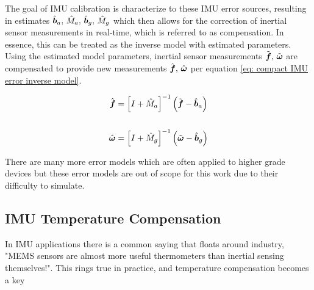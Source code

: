 The goal of IMU calibration is characterize to these IMU error sources, resulting in estimates $\hat{\boldsymbol{b}}_a, \, \hat{M}_a, \, \hat{\boldsymbol{b}}_g, \, \hat{M}_g
$ which then allows for the correction of inertial sensor measurements in real-time, which is referred to as compensation. In essence, this can be treated as the inverse model with estimated parameters. Using the estimated model parameters, inertial sensor measurements $\tilde{\boldsymbol{f}},\,\tilde{\boldsymbol{\omega}}$ are compensated to provide new measurements $\hat{\boldsymbol{f}},\,\hat{\boldsymbol{\omega}}$ per equation \ref{eq: compact IMU error inverse model}.

\begin{align} \label{eq: compact IMU error inverse model}
	\hat{\boldsymbol{f}} &= \left[I + \hat{M}_a\right]^{-1} \left(\tilde{\boldsymbol{f}} - \hat{\boldsymbol{b}}_a\right) \notag\\
	\\
	\hat{\boldsymbol{\omega}} &= \left[I + \hat{M}_g\right]^{-1} \left(\tilde{\boldsymbol{\omega}} - \hat{\boldsymbol{b}}_g\right) \notag\\
\end{align}

There are many more error models which are often applied to higher grade devices \cite{GeneralizedFramework} but these error models are out of scope for this work due to their difficulty to simulate. 


\subsection{IMU Temperature Compensation}

In IMU applications there is a common saying that floats around industry, "MEMS sensors are almost more useful thermometers than inertial sensing themselves!". This rings true in practice, and temperature compensation becomes a key


